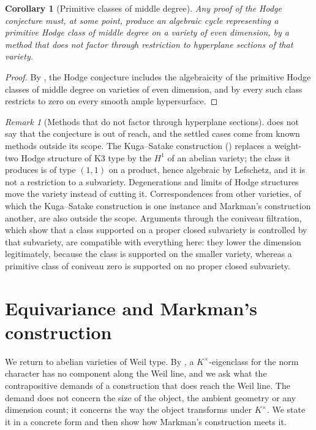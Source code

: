 \documentclass[11pt,reqno]{amsart}
\theoremstyle{plain}
\newtheorem{corollary}[theorem]{Corollary}
\theoremstyle{definition}
\theoremstyle{remark}
\newtheorem{remark}[theorem]{Remark}
\newcommand{\Kx}{K^{\times}}
\begin{document}
\begin{corollary}[Primitive classes of middle degree]\label{cor:whereidea}
Any proof of the Hodge conjecture must, at some point, produce an algebraic
cycle representing a primitive Hodge class of middle degree on a variety of
even dimension, by a method that does not factor through restriction to
hyperplane sections of that variety.
\end{corollary}

\begin{proof}
By , the Hodge conjecture includes the algebraicity of
the primitive Hodge classes of middle degree on varieties of even dimension,
and by  every such class restricts to zero on every smooth
ample hypersurface.
\end{proof}

\begin{remark}[Methods that do not factor through hyperplane sections]%
\label{rem:othermethods}
 does not say that the conjecture is out of reach, and
the settled cases come from known methods outside its scope. The
Kuga--Satake construction () replaces a weight-two Hodge
structure of K3 type by the $H^{1}$ of an abelian variety; the class it
produces is of type $(1,1)$ on a product, hence algebraic by Lefschetz, and it
is not a restriction to a subvariety. Degenerations and limits of Hodge
structures move the variety instead of cutting it. Correspondences from other
varieties, of which the Kuga--Satake construction is one instance and
Markman's construction \cite{Mar25a,Mar25b} another, are also outside the
scope. Arguments through the coniveau filtration, which show that a class
supported on a proper closed subvariety is controlled by that subvariety, are
compatible with everything here: they lower the dimension legitimately,
because the class is supported on the smaller variety, whereas a primitive
class of coniveau zero is supported on no proper closed subvariety.
\end{remark}

\section{Equivariance and Markman's construction}
\label{sec:escape}

We return to abelian varieties of Weil type. By , a
$\Kx$-eigenclass for the norm character has no component along the Weil line,
and we ask what the contrapositive demands of a construction that does reach
the Weil line. The demand does not concern the size of the object, the ambient
geometry or any dimension count; it concerns the way the object transforms
under $\Kx$. We state it in a concrete form and then show how Markman's
construction meets it.
\end{document}
